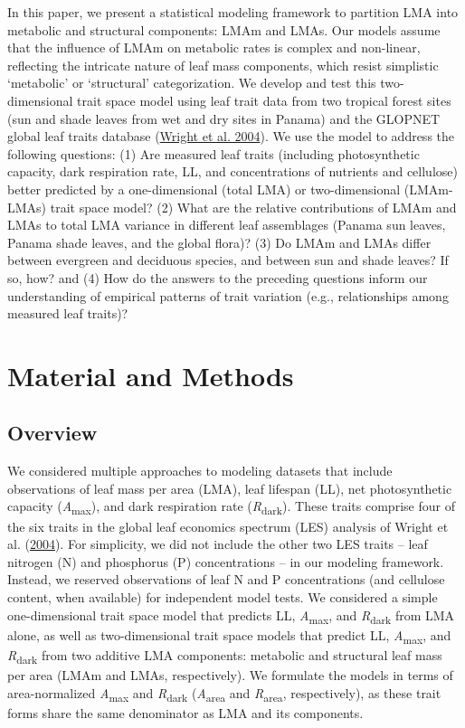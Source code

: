 \documentclass[
  12pt,
  letterpaper,
  DIV=11,
  numbers=noendperiod]{scrartcl}
\begin{document}
In this paper, we present a statistical modeling framework to partition
LMA into metabolic and structural components: LMAm and LMAs. Our models
assume that the influence of LMAm on metabolic rates is complex and
non-linear, reflecting the intricate nature of leaf mass components,
which resist simplistic `metabolic' or `structural' categorization. We
develop and test this two-dimensional trait space model using leaf trait
data from two tropical forest sites (sun and shade leaves from wet and
dry sites in Panama) and the GLOPNET global leaf traits database
(\protect\hyperlink{ref-Wright2004a}{Wright et al. 2004}). We use the
model to address the following questions: (1) Are measured leaf traits
(including photosynthetic capacity, dark respiration rate, LL, and
concentrations of nutrients and cellulose) better predicted by a
one-dimensional (total LMA) or two-dimensional (LMAm-LMAs) trait space
model? (2) What are the relative contributions of LMAm and LMAs to total
LMA variance in different leaf assemblages (Panama sun leaves, Panama
shade leaves, and the global flora)? (3) Do LMAm and LMAs differ between
evergreen and deciduous species, and between sun and shade leaves? If
so, how? and (4) How do the answers to the preceding questions inform
our understanding of empirical patterns of trait variation (e.g.,
relationships among measured leaf traits)?

\hypertarget{material-and-methods}{%
\section{Material and Methods}\label{material-and-methods}}

\hypertarget{overview}{%
\subsection{Overview}\label{overview}}

We considered multiple approaches to modeling datasets that include
observations of leaf mass per area (LMA), leaf lifespan (LL), net
photosynthetic capacity (\emph{A}\textsubscript{max}), and dark
respiration rate (\emph{R}\textsubscript{dark}). These traits comprise
four of the six traits in the global leaf economics spectrum (LES)
analysis of Wright et al. (\protect\hyperlink{ref-Wright2004a}{2004}).
For simplicity, we did not include the other two LES traits -- leaf
nitrogen (N) and phosphorus (P) concentrations -- in our modeling
framework. Instead, we reserved observations of leaf N and P
concentrations (and cellulose content, when available) for independent
model tests. We considered a simple one-dimensional trait space model
that predicts LL, \emph{A}\textsubscript{max}, and
\emph{R}\textsubscript{dark} from LMA alone, as well as two-dimensional
trait space models that predict LL, \emph{A}\textsubscript{max}, and
\emph{R}\textsubscript{dark} from two additive LMA components: metabolic
and structural leaf mass per area (LMAm and LMAs, respectively). We
formulate the models in terms of area-normalized
\emph{A}\textsubscript{max} and \emph{R}\textsubscript{dark}
(\emph{A}\textsubscript{area} and \emph{R}\textsubscript{area},
respectively), as these trait forms share the same denominator as LMA
and its components.
\end{document}
